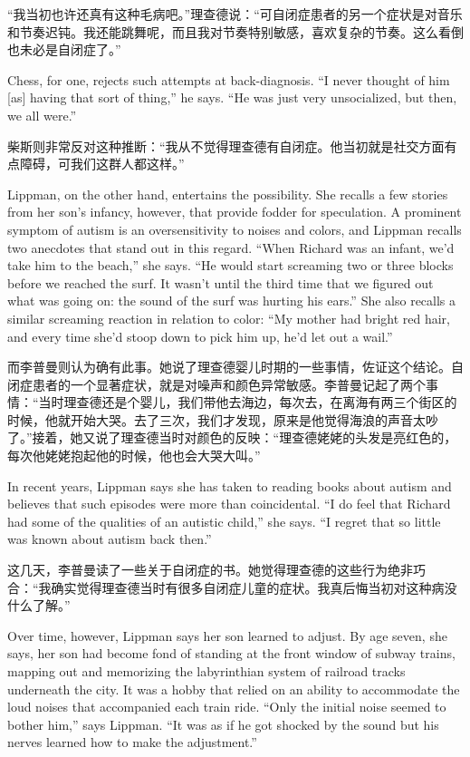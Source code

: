 \ifdefined\chs
“我当初也许还真有这种毛病吧。”理查德说：“可自闭症患者的另一个症状是对音乐和节奏迟钝。我还能跳舞呢，而且我对节奏特别敏感，喜欢复杂的节奏。这么看倒也未必是自闭症了。”
\fi

\ifdefined\eng
Chess, for one, rejects such attempts at back-diagnosis. ``I never thought of him [as] having that sort of thing,'' he says. ``He was just very unsocialized, but then, we all were.''
\fi

\ifdefined\chs
柴斯则非常反对这种推断：“我从不觉得理查德有自闭症。他当初就是社交方面有点障碍，可我们这群人都这样。”
\fi

\ifdefined\eng
Lippman, on the other hand, entertains the possibility. She recalls a few stories from her son's infancy, however, that provide fodder for speculation. A prominent symptom of autism is an oversensitivity to noises and colors, and Lippman recalls two anecdotes that stand out in this regard. ``When Richard was an infant, we'd take him to the beach,'' she says. ``He would start screaming two or three blocks before we reached the surf. It wasn't until the third time that we figured out what was going on: the sound of the surf was hurting his ears.'' She also recalls a similar screaming reaction in relation to color: ``My mother had bright red hair, and every time she'd stoop down to pick him up, he'd let out a wail.''
\fi

\ifdefined\chs
而李普曼则认为确有此事。她说了理查德婴儿时期的一些事情，佐证这个结论。自闭症患者的一个显著症状，就是对噪声和颜色异常敏感。李普曼记起了两个事情：“当时理查德还是个婴儿，我们带他去海边，每次去，在离海有两三个街区的时候，他就开始大哭。去了三次，我们才发现，原来是他觉得海浪的声音太吵了。”接着，她又说了理查德当时对颜色的反映：“理查德姥姥的头发是亮红色的，每次他姥姥抱起他的时候，他也会大哭大叫。”
\fi

\ifdefined\eng
In recent years, Lippman says she has taken to reading books about autism and believes that such episodes were more than coincidental. ``I do feel that Richard had some of the qualities of an autistic child,'' she says. ``I regret that so little was known about autism back then.''
\fi

\ifdefined\chs
这几天，李普曼读了一些关于自闭症的书。她觉得理查德的这些行为绝非巧合：“我确实觉得理查德当时有很多自闭症儿童的症状。我真后悔当初对这种病没什么了解。”
\fi

\ifdefined\eng
Over time, however, Lippman says her son learned to adjust. By age seven, she says, her son had become fond of standing at the front window of subway trains, mapping out and memorizing the labyrinthian system of railroad tracks underneath the city. It was a hobby that relied on an ability to accommodate the loud noises that accompanied each train ride. ``Only the initial noise seemed to bother him,'' says Lippman. ``It was as if he got shocked by the sound but his nerves learned how to make the adjustment.''
\fi

